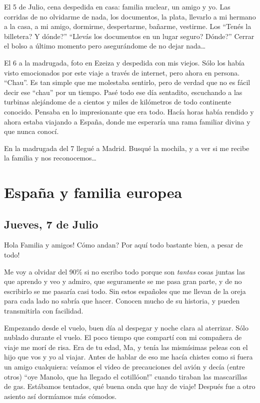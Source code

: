 El 5 de Julio, cena despedida en casa: familia nuclear, un amigo y yo. Las
corridas de no olvidarme de nada, los documentos, la plata, llevarlo a mi
hermano a la casa, a mi amigo, dormirme, despertarme, ba\~narme, vestirme. Los
``\textquestiondown Ten\'es la billetera? \textquestiondown Y d\'onde?''
``\textquestiondown Llev\'as los documentos en un lugar seguro?
\textquestiondown D\'onde?'' Cerrar el bolso a \'ultimo momento pero
asegur\'andome de no dejar nada\ldots

El 6 a la madrugada, foto en Ezeiza y despedida con mis viejos. S\'olo los
hab\'ia visto emocionados por este viaje a trav\'es de internet, pero ahora en
persona. ``Chau''. Es tan simple que me molestaba sentirlo, pero de verdad que
no es f\'acil decir ese ``chau'' por un tiempo. Pas\'e todo ese d\'ia
sentadito, escuchando a las turbinas alej\'andome de a cientos y miles de
kil\'ometros de todo continente conocido. Pensaba en lo impresionante que era
todo. Hac\'ia horas hab\'ia rendido y ahora estaba viajando a Espa\~na, donde
me esperar\'ia una rama familiar divina y que nunca conoc\'i.

En la madrugada del 7 llegu\'e a Madrid. Busqu\'e la mochila, y a ver si me
recibe la familia y nos reconocemos\ldots

\section{Espa\~na y familia europea}

\subsection*{Jueves, 7 de Julio}

\textexclamdown Hola Familia y amigos! \textquestiondown C\'omo andan?
\textexclamdown Por aqu\'i todo bastante bien, a pesar de todo!

Me voy a olvidar del 90\% si no escribo todo porque son \emph{tantas} cosas
juntas las que aprendo y veo y admiro, que seguramente se me pasa gran parte, y
de no escribirlo se me pasar\'ia casi todo. Sin estos espa\~noles que me llevan
de la oreja para cada lado no sabr\'ia que hacer. Conocen mucho de su historia,
y pueden transmitirla con facilidad.

Empezando desde el vuelo, buen d\'ia al despegar y noche clara al aterrizar.
S\'olo nublado durante el vuelo. El poco tiempo que compart\'i con mi
compa\~nera de viaje me mor\'i de risa. Era de tu edad, Ma, y ten\'ia las
mism\'isimas peleas con el hijo que vos y yo al viajar. Antes de hablar de
eso me hac\'ia chistes como si fuera un amigo cualquiera: ve\'iamos el video
de precauciones del avi\'on y dec\'ia (entre otros) ``\textexclamdown oye
Manolo, que ha llegado el cotill\'oon!'' cuando tiraban las mascarillas de
gas. Est\'abamos tentados, \textexclamdown qu\'e buena onda que hay de viaje!
Despu\'es fue a otro asiento as\'i dorm\'iamos m\'as c\'omodos.

